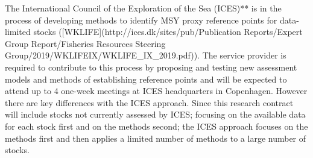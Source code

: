 The International Council of the Exploration of the Sea (ICES)** is in the process of developing methods to identify MSY proxy reference points for data-limited stocks ([WKLIFE](http://ices.dk/sites/pub/Publication Reports/Expert Group Report/Fisheries Resources Steering Group/2019/WKLIFEIX/WKLIFE_IX_2019.pdf)). The service provider is required to contribute to this process by proposing and testing new assessment models and methods of establishing reference points and will be expected to attend up to 4 one-week meetings at ICES headquarters in Copenhagen. However there are key differences with the ICES approach. Since this research contract will include stocks not currently assessed by ICES; focusing on the available data for each stock first and on the methods second; the ICES approach focuses on the methods first and then applies a limited number of methods to a large number of stocks.


